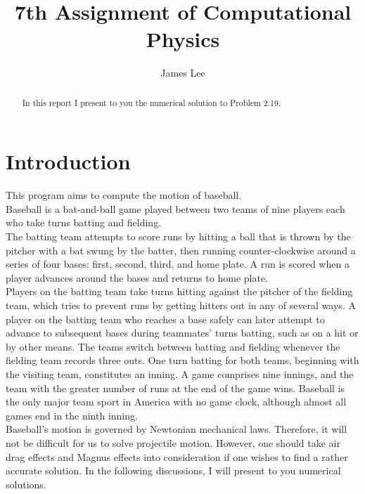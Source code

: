 \documentclass[10pt,a4paper]{article}
\author{James Lee}
\title{7th Assignment of Computational Physics}
\begin{document}
	\maketitle
	\begin{abstract}
		In this report I present to you the numerical solution to Problem 2.19.
	\end{abstract}
	\section{Introduction}
	This program aims to compute the motion of baseball.\\
	Baseball is a bat-and-ball game played between two teams of nine players each who take turns batting and fielding.\\
	The batting team attempts to score runs by hitting a ball that is thrown by the pitcher with a bat swung by the batter, then running counter-clockwise around a series of four bases: first, second, third, and home plate. A run is scored when a player advances around the bases and returns to home plate.\\
	Players on the batting team take turns hitting against the pitcher of the fielding team, which tries to prevent runs by getting hitters out in any of several ways. A player on the batting team who reaches a base safely can later attempt to advance to subsequent bases during teammates' turns batting, such as on a hit or by other means. The teams switch between batting and fielding whenever the fielding team records three outs. One turn batting for both teams, beginning with the visiting team, constitutes an inning. A game comprises nine innings, and the team with the greater number of runs at the end of the game wins. Baseball is the only major team sport in America with no game clock, although almost all games end in the ninth inning.\\
	Baseball's motion is governed by Newtonian mechanical laws. Therefore, it will not be difficult for us to solve projectile motion. However, one should take air drag effects and Magnus effects into consideration if one wishes to find a rather accurate solution. In the following discussions, I will present to you numerical solutions.
\end{document}
